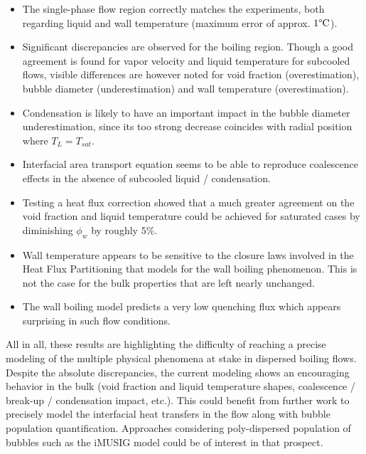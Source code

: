 \begin{itemize}
\item The single-phase flow region correctly matches the experiments, both regarding liquid and wall temperature (maximum error of approx. $1\degree\mathrm{C}$).

\item Significant discrepancies are observed for the boiling region. Though a good agreement is found for vapor velocity and liquid temperature for subcooled flows, visible differences are however noted for void fraction (overestimation), bubble diameter (underestimation) and wall temperature (overestimation). 

\item Condensation is likely to have an important impact in the bubble diameter underestimation, since its too strong decrease coincides with radial position where $T_{L}=T_{sat}$. 

\item Interfacial area transport equation seems to be able to reproduce coalescence effects in the absence of subcooled liquid / condensation.


\item Testing a heat flux correction showed that a much greater agreement on the void fraction and liquid temperature could be achieved for saturated cases by diminishing $\phi_{w}$ by roughly $5\%$.

\item Wall temperature appears to be sensitive to the closure laws involved in the Heat Flux Partitioning that models for the wall boiling phenomenon. This is not the case for the bulk properties that are left nearly unchanged.

\item The wall boiling model predicts a very low quenching flux which appears surprising in such flow conditions. 


\end{itemize} 

All in all, these results are highlighting the difficulty of reaching a precise modeling of the multiple physical phenomena at stake in dispersed boiling flows. Despite the absolute discrepancies, the current modeling shows an encouraging behavior in the bulk (void fraction and liquid temperature shapes, coalescence / break-up / condensation impact, etc.). This could benefit from further work to precisely model the interfacial heat transfers in the flow along with bubble population quantification. Approaches considering poly-dispersed population of bubbles such as the iMUSIG model \cite{krepper_inhomogeneous_2008} could be of interest in that prospect.

